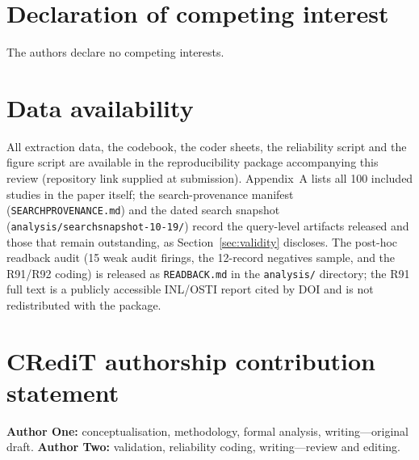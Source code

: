 \documentclass[preprint,12pt]{elsarticle}
\renewcommand{\_}{\plainunderscore\allowbreak}
\begin{document}
\section*{Declaration of competing interest}
The authors declare no competing interests.

\section*{Data availability}
All extraction data, the codebook, the coder sheets, the reliability script and the figure script
are available in the reproducibility package accompanying this review (repository link supplied
at submission). Appendix~A lists all 100 included studies in the paper itself;
the search-provenance manifest (\texttt{SEARCH\_PROVENANCE.md}) and the dated search snapshot
(\texttt{analysis/search\_snapshot\_2026-10-19/}) record the query-level artifacts released
and those that remain outstanding, as Section~\ref{sec:validity} discloses. The post-hoc
readback audit (15 weak audit firings, the 12-record negatives sample, and the R91/R92
coding) is released as \texttt{READBACK.md} in the \texttt{analysis/} directory;
the R91 full text is a publicly
accessible INL/OSTI report cited by DOI and is not redistributed with the package.

\section*{CRediT authorship contribution statement}
\textbf{Author One:} conceptualisation, methodology, formal analysis, writing---original draft.
\textbf{Author Two:} validation, reliability coding, writing---review and editing.


\nocite{*}
\clearpage



\end{document}
